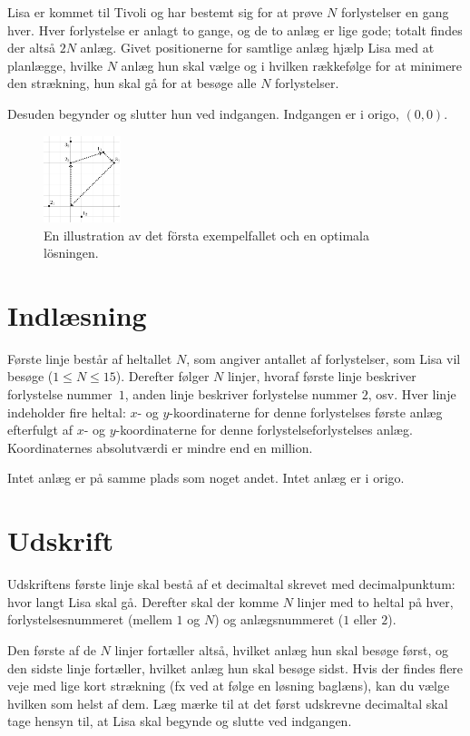 
Lisa er kommet til Tivoli og har bestemt sig for at prøve $N$ forlystelser en gang hver.
Hver forlystelse er anlagt to gange, og de to anlæg er lige gode; totalt findes der altså $2N$ anlæg.
Givet positionerne for samtlige anlæg hjælp Lisa med at planlægge, hvilke $N$ anlæg hun skal vælge og i hvilken rækkefølge for at minimere den strækning, hun skal gå for at besøge alle $N$ forlystelser.

Desuden begynder og slutter hun ved indgangen. Indgangen er i origo, $(0,0)$.

\begin{figure}[h]
    \centering
    \includegraphics[width=0.2\textwidth]{tivoli}
    \caption{En illustration av det första exempelfallet och en optimala lösningen.}
\end{figure}

\section*{Indlæsning}
Første linje består af heltallet $N$, som angiver antallet af forlystelser, som Lisa vil besøge ($1 \le N \le 15$).
Derefter følger $N$ linjer, hvoraf første linje beskriver forlystelse  nummer~$1$, anden linje beskriver forlystelse nummer $2$, osv.
Hver linje indeholder fire heltal: $x$- og $y$-koordinaterne for denne forlystelses første anlæg efterfulgt af $x$- og $y$-koordinaterne for denne forlystelseforlystelses anlæg.
Koordinaternes absolutværdi er mindre end en million.

Intet anlæg er på samme plads som noget andet.
Intet anlæg er i origo.

\section*{Udskrift}
Udskriftens første linje skal bestå af et decimaltal skrevet med decimalpunktum: hvor langt Lisa skal gå. 
Derefter skal der komme $N$ linjer med to heltal på hver, forlystelsesnummeret (mellem $1$ og $N$) og anlægsnummeret ($1$ eller $2$).

Den første af de $N$ linjer fortæller altså, hvilket anlæg hun skal besøge først, og den sidste linje fortæller, hvilket anlæg hun skal besøge sidst.
Hvis der findes flere veje med lige kort strækning (fx ved at følge en løsning baglæns), kan du vælge hvilken som helst af dem.
Læg mærke til at det først udskrevne decimaltal skal tage hensyn til, at Lisa skal begynde og slutte ved indgangen.

